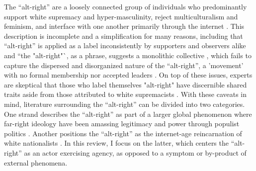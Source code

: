 \documentclass[acmlarge, screen, authorversion]{acmart}
\begin{document}
The ``alt-right” are a loosely connected group of individuals who predominantly support white supremacy and hyper-masculinity, reject multiculturalism and feminism, and interface with one another primarily through the internet
\cite{sternProudBoysWhite2019, mainRiseAltRight2018, nagleKillAllNormies2017, hawleyMakingSenseAltright2017}.
This description is incomplete and a simplification for
many reasons, including that ``alt-right'' is applied as a label inconsistently
by supporters and observers alike \cite{hawleyMakingSenseAltright2017} and
``the "alt-right"`, as a phrase, suggests a monolithic collective
\cite{massanariRethinkingResearchEthics2018}, which fails to capture the
dispersed and disorganized \cite{martinDissectingTrumpMost2017} nature of the
``alt-right'', a 'movement' with no formal membership nor accepted leaders
\cite{hawleyMakingSenseAltright2017}. On top of these issues, experts are
skeptical that those who label themselves "alt-right" have discernible shared
traits aside from those attributed to white supremacists
\cite{gallaherMainstreamingWhiteSupremacy2020,
johndaniszewskiWritingAltright2016}.  With these caveats in mind, literature
surrounding the ``alt-right” can be divided into two categories. One strand
describes the ``alt-right'' as part
of a larger global phenomenon where far-right ideology have been
amassing legitimacy and power through populist politics
\cite{cammaertsMainstreamingExtremeRightWing2018,
worthMorbidSymptomsGlobal2019}. Another positions the
``alt-right” as the internet-age reincarnation of white nationalists
\cite{hawleyMakingSenseAltright2017, mainRiseAltRight2018}. In this review,
I focus on the latter, which centers the ``alt-right'' as an actor exercising agency, as opposed to a symptom or by-product of external phenomena.
\end{document}
